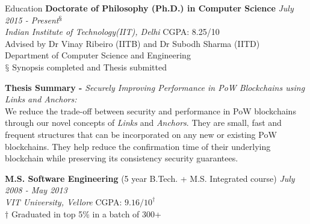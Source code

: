 \documentclass{resume} %
\begin{document}

\begin{rSection}{Education}
\textbf{Doctorate of Philosophy (Ph.D.) in Computer Science} \hfill {\em July 2015 - Present$^\mathsection$} 
\\\textit{Indian Institute of Technology(IIT), Delhi}  \hfill { CGPA: 8.25/10}
\\ Advised by Dr Vinay Ribeiro (IITB) and Dr Subodh Sharma (IITD)
\\ Department of Computer Science and Engineering\\ 
$\mathsection$ Synopsis completed and Thesis submitted

{\bf Thesis Summary -} \textit{Securely Improving Performance in PoW Blockchains using Links and Anchors:}\\ 
We reduce the trade-off between security and performance in PoW blockchains through our novel concepts of \textit{Links} and \textit{Anchors}. They are small, fast and frequent structures that can be incorporated on any new or existing PoW blockchains. They help reduce the confirmation time of their underlying blockchain while preserving its consistency security guarantees. 



\textbf{M.S. Software Engineering} (5 year B.Tech. + M.S. Integrated course) \hfill {\em July 2008 - May 2013} 
\\\textit{VIT University, Vellore} \hfill { CGPA: $9.16/10^\dagger$}\\
$\dagger$ Graduated in top 5\% in a batch of 300+


\end{rSection}
\end{document}
